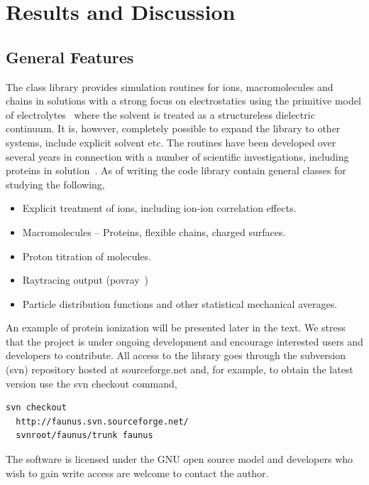 \documentclass[10pt]{bmc_article}
\newenvironment{bmcformat}{\fussy\setboolean{publ}{true}}{\fussy}
\begin{document}
\begin{bmcformat}
 
\section*{Results and Discussion}

\subsection*{General Features}
The class library provides simulation routines for ions, macromolecules and chains in solutions with a strong focus on electrostatics using the primitive model of electrolytes~\cite{hill:86} where the solvent is treated as a structureless dielectric continuum. It is, however, completely possible to expand the library to other systems, include explicit solvent etc. The routines have been developed over several years in connection with a number of scientific investigations, including proteins in solution~\cite{lund:05}. As of writing the code library contain general classes for studying the following,
\begin{itemize}
\item Explicit treatment of ions, including ion-ion correlation effects.
\item Macromolecules -- Proteins, flexible chains, charged surfaces.
\item Proton titration of molecules.
\item Raytracing output (povray~\cite{povray})
\item Particle distribution functions and other statistical mechanical averages.
\end{itemize}
An example of protein ionization will be presented later in the text. We stress that the project is under ongoing development and encourage interested users and developers to contribute. All access to the library goes through the subversion (svn) repository hosted at sourceforge.net and, for example, to obtain the latest version use the svn checkout command,
\begin{verbatim}
svn checkout
  http://faunus.svn.sourceforge.net/
  svnroot/faunus/trunk faunus
\end{verbatim}
The software is licensed under the GNU open source model and developers who wish to gain write access are welcome to contact the author.



\end{bmcformat}
\end{document}
